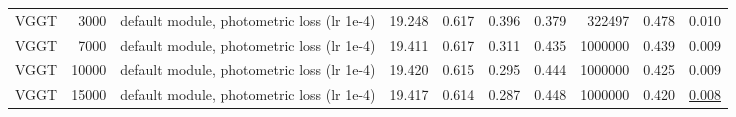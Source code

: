 \begin{table}[H]
\begin{tabular}{lrlrrrrrrr}
VGGT & 3000 & default module, photometric loss (lr 1e-4) & 19.248 & 0.617 & 0.396 & 0.379 & 322497 & 0.478 & 0.010 \\
VGGT & 7000 & default module, photometric loss (lr 1e-4) & 19.411 & 0.617 & 0.311 & 0.435 & 1000000 & 0.439 & 0.009 \\
VGGT & 10000 & default module, photometric loss (lr 1e-4) & 19.420 & 0.615 & 0.295 & 0.444 & 1000000 & 0.425 & 0.009 \\
VGGT & 15000 & default module, photometric loss (lr 1e-4) & 19.417 & 0.614 & 0.287 & 0.448 & 1000000 & 0.420 & \underline{0.008} \\
\bottomrule
\end{tabular}
\end{table}